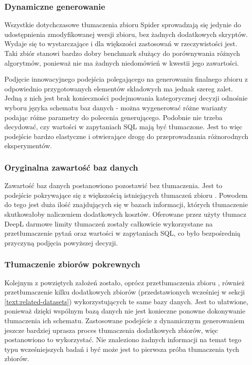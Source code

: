\subsubsection{Dynamiczne generowanie}
Wszystkie dotychczasowe tłumaczenia zbioru Spider sprowadzają się jedynie do udostępnienia zmodyfikowanej wersji zbioru, bez żadnych dodatkowych skryptów. Wydaje się to wystarczające i dla większości zastosowań w rzeczywistości jest. Taki zbiór stanowi bardzo dobry benchmark służący do porównywania różnych algorytmów, ponieważ nie ma żadnych niedomówień w kwestii jego zawartości.

Podjęcie innowacyjnego podejścia polegającego na generowaniu finalnego zbioru z odpowiednio przygotowanych elementów składowych ma jednak szereg zalet. Jedną z nich jest brak konieczności podejmowania kategorycznej decyzji odnośnie wyboru języka schematu baz danych - można wygenerować różne warianty podając różne parametry do polecenia generującego. Podobnie nie trzeba decydować, czy wartości w zapytaniach SQL mają być tłumaczone. Jest to więc podejście bardzo elastyczne i otwierające drogę do przeprowadzania różnorodnych eksperymentów.

\subsubsection{Oryginalna zawartość baz danych}
Zawartość baz danych postanowiono pozostawić bez tłumaczenia. Jest to podejście pokrywające się z większością istniejących tłumaczeń zbioru . Powodem do tego jest duża ilość znajdujących się w bazach informacji, których tłumaczenie skutkowałoby naliczeniem dodatkowych kosztów. Oferowane przez użyty tłumacz DeepL darmowe limity tłumaczeń zostały całkowicie wykorzystane na przetłumaczenie pytań oraz wartości w zapytaniach SQL, co było bezpośrednią przyczyną podjęcia powyższej decyzji.

\subsubsection{Tłumaczenie zbiorów pokrewnych}
Kolejnym z powziętych założeń zostało, oprócz przetłumaczenia zbioru , również przetłumaczenie kilku dodatkowych zbiorów (przedstawionych wcześniej w sekcji \ref{text:related-datasets}) wykorzystujących te same bazy danych. Jest to ułatwione, ponieważ dzięki wspólnym bazą danych nie jest konieczne ponowne dokonywanie tłumaczenia ich schematu. Zastosowane podejście z dynamicznym generowaniem jeszcze bardziej uprasza proces tłumaczenia dodatkowych zbiorów, więc postanowiono to wykorzystać. Nie znaleziono żadnych informacji na temat tego typu wcześniejszych badań i być może jest to pierwsza próba tłumaczenia tych zbiorów.

